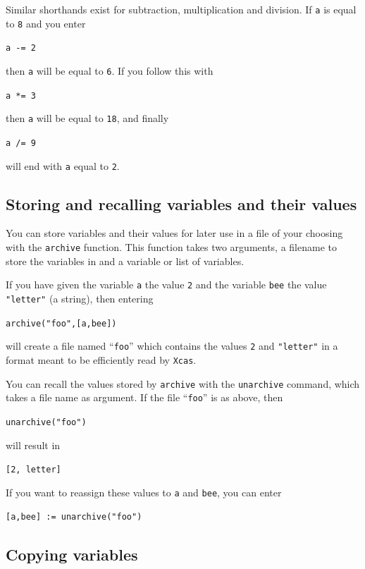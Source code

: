 \documentclass[a4paper,11pt]{book}
\begin{document}
Similar shorthands exist for subtraction, multiplication and division.
If \texttt{a} is equal to \texttt{8} and you enter
\begin{center}
  {\tt a -= 2\index{-=}}
\end{center}
then \texttt{a} will be equal to \texttt{6}.  If you follow this with
\begin{center}
  {\tt a *= 3\index{*=}}
\end{center}
then \texttt{a} will be equal to \texttt{18}, and finally
\begin{center}
  {\tt a /= 9\index{/=}}
\end{center}
will end with \texttt{a} equal to \texttt{2}.


\subsection{Storing and recalling variables and their values}

You can store variables and their values for later use in a file of
your choosing with the \texttt{archive} function.  This
function takes two arguments, a filename to store the variables in and
a variable or list of variables.

If you have given the variable \texttt{a} the value \texttt{2} and the
variable \texttt{bee} the value \texttt{"letter"} (a string), then
entering
\begin{center}
  {\tt archive("foo",[a,bee])}
\end{center}
will create a file named ``\texttt{foo}'' which contains the values
\texttt{2} and \texttt{"letter"} in a format meant to be efficiently
read by \texttt{Xcas}.

You can recall the values stored by \texttt{archive} with the
\texttt{unarchive} command, which takes a file name
as argument.  If the file ``\texttt{foo}'' is as above, then 
\begin{center}
  {\tt unarchive("foo")}
\end{center}
will result in
\begin{center}
  {\tt [2, letter]}
\end{center}
If you want to reassign these values to \texttt{a} and \texttt{bee},
you can enter
\begin{center}
  {\tt [a,bee] := unarchive("foo")}
\end{center}

\subsection{Copying variables}
\label{subsec:copyvar}
\end{document}
